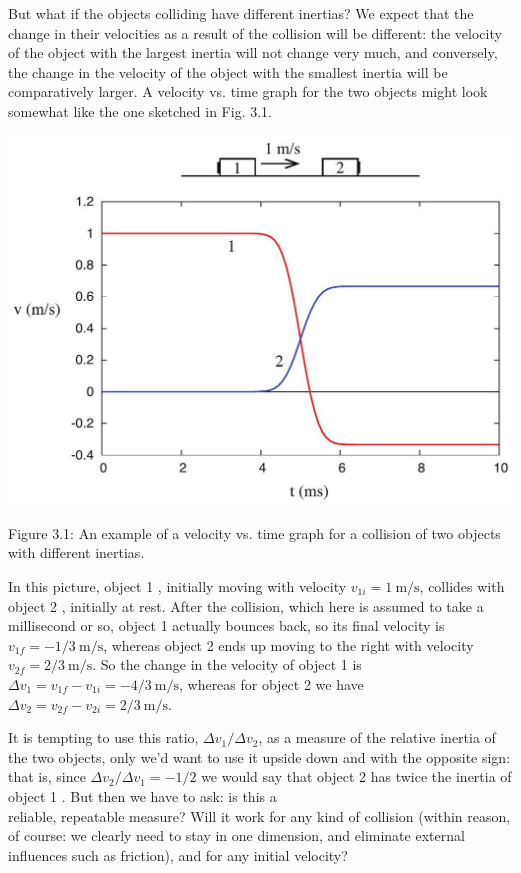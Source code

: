 \documentclass[10pt]{article}
\begin{document}
But what if the objects colliding have different inertias? We expect that the change in their velocities as a result of the collision will be different: the velocity of the object with the largest inertia will not change very much, and conversely, the change in the velocity of the object with the smallest inertia will be comparatively larger. A velocity vs. time graph for the two objects might look somewhat like the one sketched in Fig. 3.1.

\begin{center}
\includegraphics[max width=\textwidth]{2024_09_14_9969b06773f10b6936e8g-070}
\end{center}

Figure 3.1: An example of a velocity vs. time graph for a collision of two objects with different inertias.

In this picture, object 1 , initially moving with velocity $v_{1 i}=1 \mathrm{~m} / \mathrm{s}$, collides with object 2 , initially at rest. After the collision, which here is assumed to take a millisecond or so, object 1 actually bounces back, so its final velocity is $v_{1 f}=-1 / 3 \mathrm{~m} / \mathrm{s}$, whereas object 2 ends up moving to the right with velocity $v_{2 f}=2 / 3 \mathrm{~m} / \mathrm{s}$. So the change in the velocity of object 1 is $\Delta v_{1}=v_{1 f}-v_{1 i}=-4 / 3 \mathrm{~m} / \mathrm{s}$, whereas for object 2 we have $\Delta v_{2}=v_{2 f}-v_{2 i}=2 / 3 \mathrm{~m} / \mathrm{s}$.

It is tempting to use this ratio, $\Delta v_{1} / \Delta v_{2}$, as a measure of the relative inertia of the two objects, only we'd want to use it upside down and with the opposite sign: that is, since $\Delta v_{2} / \Delta v_{1}=-1 / 2$ we would say that object 2 has twice the inertia of object 1 . But then we have to ask: is this a\\
reliable, repeatable measure? Will it work for any kind of collision (within reason, of course: we clearly need to stay in one dimension, and eliminate external influences such as friction), and for any initial velocity?
\end{document}
